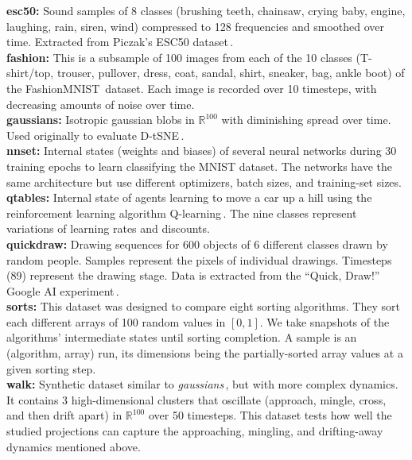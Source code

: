 \noindent \textbf{esc50:} Sound samples of 8 classes (brushing teeth, chainsaw, crying baby, engine, laughing, rain, siren, wind) compressed to 128 frequencies and smoothed over time. Extracted from Piczak's ESC50 dataset\,\citep{dataset:esc50}.\\

\noindent \textbf{fashion:} This is a subsample of 100 images from each of the 10 classes (T-shirt/top, trouser, pullover, dress, coat, sandal, shirt, sneaker, bag, ankle boot) of the FashionMNIST\,\citep{dataset:Xiao2017} dataset. Each image is recorded over 10 timesteps, with decreasing amounts of noise over time.\\

\noindent \textbf{gaussians:} Isotropic gaussian blobs in $\mathbb{R}^{100}$ with diminishing spread over time. Used originally to evaluate D-tSNE\,\citep{Rauber2016}.\\

\noindent \textbf{nnset:} Internal states (weights and biases) of several neural networks during 30 training epochs to learn classifying the MNIST dataset. The networks have the same architecture but use different optimizers, batch sizes, and training-set sizes.\\

\noindent \textbf{qtables:} Internal state of agents learning to move a car up a hill using the reinforcement learning algorithm Q-learning\,\citep{qlearning}. The nine classes represent variations of learning rates and discounts.\\

\noindent \textbf{quickdraw:} Drawing sequences for 600 objects of 6 different classes drawn by random people. Samples represent the pixels of individual drawings. Timesteps (89) represent the drawing stage. Data is extracted from the ``Quick, Draw!'' Google AI experiment\,\citep{dataset:quickdraw}.\\

\noindent \textbf{sorts:} This dataset was designed to compare eight sorting algorithms. They sort each different arrays of 100 random values in $[0,1]$. 
We take snapshots of the algorithms' intermediate states until sorting completion. A sample is an (algorithm, array) run, its dimensions being the partially-sorted array values at a given sorting step.\\

\noindent \textbf{walk:} Synthetic dataset similar to \emph{gaussians}\,\citep{Rauber2016}, but with more complex dynamics. It contains 3 high-dimensional clusters that oscillate (approach, mingle, cross, and then drift apart) in $\mathbb{R}^{100}$ over 50 timesteps. This dataset tests how well the studied projections can capture the approaching, mingling, and drifting-away dynamics mentioned above.

